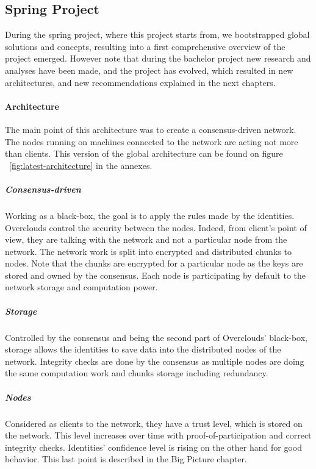 
\subsection{Spring Project}
During the spring project, where this project starts from, we bootstrapped global solutions and concepts, resulting into a first comprehensive overview of the project emerged. However note that during the bachelor project new research and analyses have been made, and the project has evolved, which resulted in new architectures, and new recommendations explained in the next chapters.

\paragraph{Architecture}
The main point of this architecture was to create a consensus-driven network. The nodes running on machines connected to the network are acting not more than clients. This version of the global architecture can be found on figure ~\ref{fig:latest-architecture} in the annexes.

\subparagraph{Consensus-driven} Working as a black-box, the goal is to apply the rules made by the identities. Overclouds control the security between the nodes. Indeed, from client's point of view, they are talking with the network and not a particular node from the network. The network work is split into encrypted and distributed chunks to nodes. Note that the chunks are encrypted for a particular node as the keys are stored and owned by the consensus. Each node is participating by default to the network storage and computation power.

\subparagraph{Storage} Controlled by the consensus and being the second part of Overclouds' black-box, storage allows the identities to save data into the distributed nodes of the network. Integrity checks are done by the consensus as multiple nodes are doing the same computation work and chunks storage including redundancy.

\subparagraph{Nodes} Considered as clients to the network, they have a trust level, which is stored on the network. This level increases over time with proof-of-participation and correct integrity checks. Identities' confidence level is rising on the other hand for good behavior. This last point is described in the Big Picture chapter.


